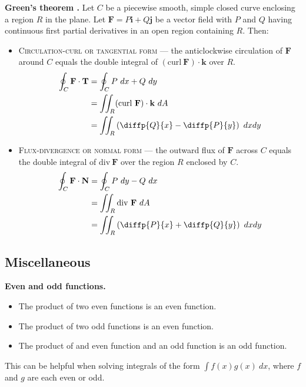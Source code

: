 \begin{shaded}
\textbf{Green's theorem \cite{thomas_calculus}.} Let $C$ be a piecewise smooth, simple closed curve enclosing a region $R$ in the
plane. Let $\mathbf{F} = P \mathbf{i} + Q \mathbf{j}$ be a vector field with $P$ and $Q$ having continuous first partial derivatives in an open region containing $R$. Then:
\begin{itemize}
	\item \textsc{Circulation-curl or tangential form} --- the anticlockwise circulation of $\mathbf{F}$ around $C$ equals the double integral of $(\text{curl} \ \mathbf{F}) \cdot \mathbf{k}$ over $R$.
\begin{align*}
\oint_C \mathbf{F} \cdot \mathbf{T} &= \oint_C P \ dx + Q \ dy \\
&= \iint_R (\text{curl} \ \mathbf{F}) \cdot \mathbf{k} \ dA \\
&= \iint_R \left( \diffp{Q}{x} - \diffp{P}{y} \right) \ dx dy
\end{align*}
	\item \textsc{Flux-divergence or normal form} --- the outward flux of $\mathbf{F}$ across $C$ equals the double integral of $\text{div} \ \mathbf{F}$ over the region $R$ enclosed by $C$.
\begin{align*}
\oint_C \mathbf{F} \cdot \mathbf{N} &= \oint_C P \ dy - Q \ dx \\
&= \iint_R \text{div} \ \mathbf{F} \ dA \\
&= \iint_R \left( \diffp{P}{x} + \diffp{Q}{y} \right) \ dx dy
\end{align*}
\end{itemize}
\end{shaded}

\subsection{Miscellaneous}

\begin{shaded}
\textbf{Even and odd functions.}
\begin{itemize}
	\item The product of two even functions is an even function.
	\item The product of two odd functions is an even function.
	\item The product of and even function and an odd function is an odd function.
\end{itemize}

This can be helpful when solving integrals of the form $\int f(x)g(x) \ dx$, where $f$ and $g$ are each even or odd.
\end{shaded}